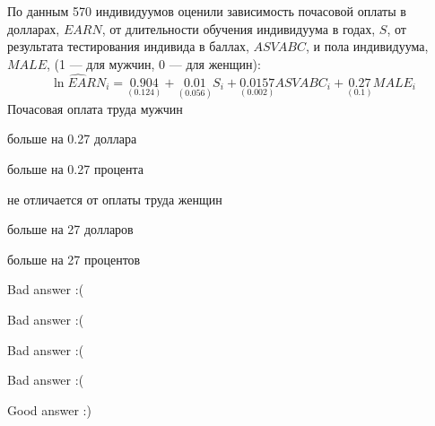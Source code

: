
\begin{question}
По данным 570 индивидуумов оценили зависимость почасовой оплаты в долларах,
\(EARN\), от длительности обучения индивидуума в годах, \(S\),
от результата тестирования индивида в баллах, \(ASVABC\),
и пола индивидуума, \(MALE\), (1 --- для мужчин, 0 --- для женщин):
\[
\widehat{\ln EARN}_i = \underset{(0.124)}{0.904} +
\underset{(0.056)}{0.01}S_i + \underset{(0.002)}{0.0157} ASVABC_i + \underset{(0.1)}{0.27} MALE_i
\]
Почасовая оплата труда мужчин
\begin{answerlist}
  \item больше на 0.27 доллара
  \item больше на 0.27 процента
  \item не отличается от оплаты труда женщин
  \item больше на 27 долларов
  \item больше на 27 процентов
\end{answerlist}
\end{question}

\begin{solution}
\begin{answerlist}
  \item Bad answer :(
  \item Bad answer :(
  \item Bad answer :(
  \item Bad answer :(
  \item Good answer :)
\end{answerlist}
\end{solution}

